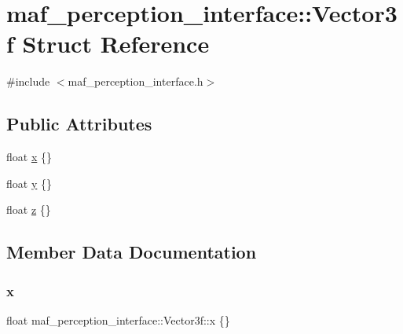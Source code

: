 \hypertarget{structmaf__perception__interface_1_1Vector3f}{}\section{maf\+\_\+perception\+\_\+interface\+:\+:Vector3f Struct Reference}
\label{structmaf__perception__interface_1_1Vector3f}


{\ttfamily \#include $<$maf\+\_\+perception\+\_\+interface.\+h$>$}

\subsection*{Public Attributes}
\begin{DoxyCompactItemize}
\item 
float \hyperlink{structmaf__perception__interface_1_1Vector3f_afbd3096652e4c4110e6bbdc5ca42e714}{x} \{\}
\item 
float \hyperlink{structmaf__perception__interface_1_1Vector3f_a3e6b57a24a58af2b09a3e1bcaebc2c91}{y} \{\}
\item 
float \hyperlink{structmaf__perception__interface_1_1Vector3f_ac078bbbbe561f8ff8bbe27a7a43f59a2}{z} \{\}
\end{DoxyCompactItemize}


\subsection{Member Data Documentation}
\mbox{\label{structmaf__perception__interface_1_1Vector3f_afbd3096652e4c4110e6bbdc5ca42e714}} 
\subsubsection{\texorpdfstring{x}{x}}
{\footnotesize\ttfamily float maf\+\_\+perception\+\_\+interface\+::\+Vector3f\+::x \{\}}

\mbox{\label{structmaf__perception__interface_1_1Vector3f_a3e6b57a24a58af2b09a3e1bcaebc2c91}} 
